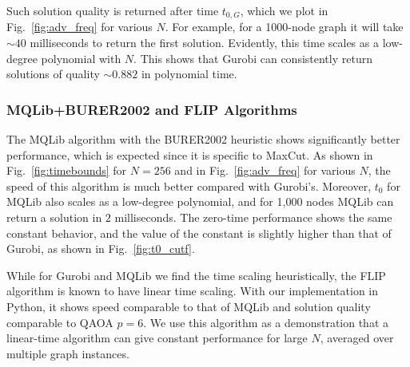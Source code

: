 Such solution quality is returned after time $t_{0,G}$, which we plot in Fig.~\ref{fig:adv_freq} for various $N$. For example, for a 1000-node graph it will take $\sim 40$ milliseconds to return the first solution. Evidently, this time scales as a low-degree polynomial with $N$. This shows that Gurobi can consistently return solutions of quality $\sim 0.882$ in polynomial time.


\subsubsection{MQLib+BURER2002 and FLIP Algorithms}

The MQLib algorithm with the BURER2002 heuristic shows significantly better performance, which is expected since it is specific to MaxCut.
As shown in Fig.~\ref{fig:timebounds} for $N=256$ and in Fig.~\ref{fig:adv_freq} for various $N$, the speed of this algorithm is much better compared with Gurobi's. Moreover, 
$t_0$ for MQLib also scales as a low-degree polynomial, and for 1,000 nodes MQLib can return a solution in $2$ milliseconds.
The zero-time performance shows the same constant behavior, and the value of the constant is slightly higher than that of Gurobi, as shown in Fig.~\ref{fig:t0_cutf}.

While for Gurobi and MQLib we find the time scaling heuristically, the FLIP algorithm is known to have linear time scaling. With our implementation in Python, it shows speed comparable to that of MQLib and solution quality comparable to QAOA $p=6$.
We use this algorithm as a demonstration that a linear-time algorithm can give constant performance for large $N$, averaged over multiple graph instances.
